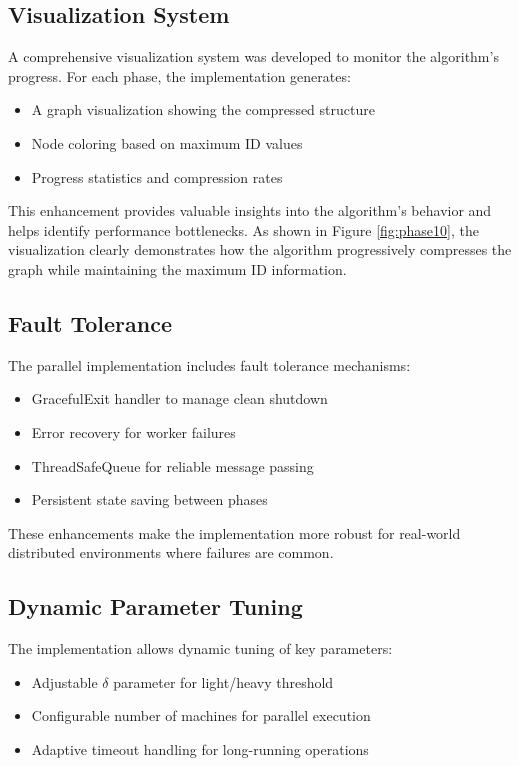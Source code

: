 \documentclass[11pt,a4paper]{article}
\begin{document}
\subsection{Visualization System}

A comprehensive visualization system was developed to monitor the algorithm's progress. For each phase, the implementation generates:
\begin{itemize}
    \item A graph visualization showing the compressed structure
    \item Node coloring based on maximum ID values
    \item Progress statistics and compression rates
\end{itemize}

This enhancement provides valuable insights into the algorithm's behavior and helps identify performance bottlenecks. As shown in Figure \ref{fig:phase10}, the visualization clearly demonstrates how the algorithm progressively compresses the graph while maintaining the maximum ID information.

\subsection{Fault Tolerance}

The parallel implementation includes fault tolerance mechanisms:
\begin{itemize}
    \item GracefulExit handler to manage clean shutdown
    \item Error recovery for worker failures
    \item ThreadSafeQueue for reliable message passing
    \item Persistent state saving between phases
\end{itemize}

These enhancements make the implementation more robust for real-world distributed environments where failures are common.

\subsection{Dynamic Parameter Tuning}

The implementation allows dynamic tuning of key parameters:
\begin{itemize}
    \item Adjustable $\delta$ parameter for light/heavy threshold
    \item Configurable number of machines for parallel execution
    \item Adaptive timeout handling for long-running operations
\end{itemize}
\end{document}
